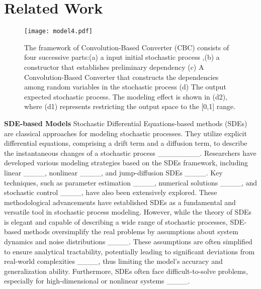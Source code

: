 \section{Related Work}
\begin{figure*}[htbp]
  \centering
  \texttt{[image: model4.pdf]}
  \caption{The framework of Convolution-Based Converter (CBC) consists of four successive parts:(a) a input initial stochastic process ,(b) a constructor that establishes preliminary dependency  (c) A Convolution-Based Converter that constructs the dependencies among random variables in the stochastic process (d) The output expected stochastic process. The modeling effect is shown in (d2), where (d1) represents restricting the output space to the [0,1] range.}
  \label{fig:model}
\end{figure*}
\noindent \textbf{SDE-based Models}   Stochastic Differential Equations-based methods (SDEs) are classical approaches for modeling stochastic processes. They utilize explicit differential equations, comprising a drift term and a diffusion term, to describe the instantaneous changes of a stochastic process ________.
Researchers have developed various modeling strategies based on the SDEs framework, including linear ____, nonlinear ____, and jump-diffusion SDEs ____. Key techniques, such as parameter estimation ____, numerical solutions ____, and stochastic control ____, have also been extensively explored. These methodological advancements have established SDEs as a fundamental and versatile tool in stochastic process modeling. However, while the theory of SDEs is elegant and capable of describing a wide range of stochastic processes, SDE-based methods oversimplify the real problems by assumptions about system dynamics and noise distributions ____. These assumptions are often simplified to ensure analytical tractability, potentially leading to significant deviations from real-world complexities ____, thus limiting the model's accuracy and generalization ability. Furthermore, SDEs often face difficult-to-solve problems, especially for high-dimensional or nonlinear systems ____.

